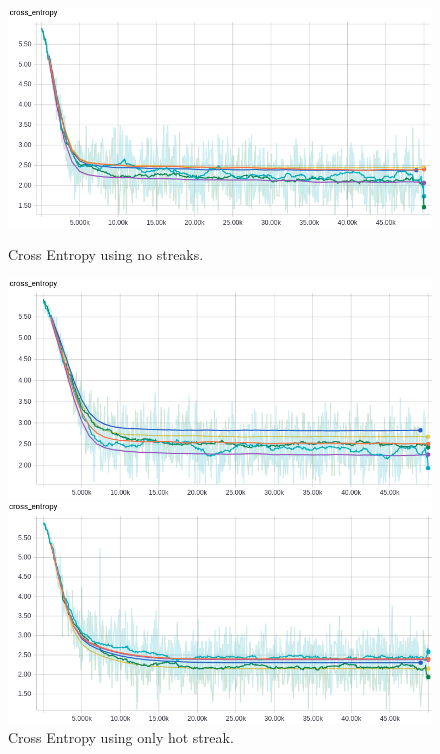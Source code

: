 \documentclass{article} %
\begin{document}
\begin{figure}[!htb]
  \includegraphics[width=\linewidth]{plots/model1/wteam_onehot/streak-/crossentropy.png}
  \caption{Cross Entropy using no streaks.}\label{fig:wteam-onehot--crossentropy}
\endminipage\hfill
{}
  \includegraphics[width=\linewidth]{plots/model1/wteam_onehot/streak-h/crossentropy.png}
  \caption{Cross Entropy using only hot streak.}\label{fig:wteam-onehot-h-crossentropy}
\endminipage\hfill
{}%
  \includegraphics[width=\linewidth]{plots/model1/wteam_onehot/streak-r/crossentropy.png}

\end{figure}
\end{document}
